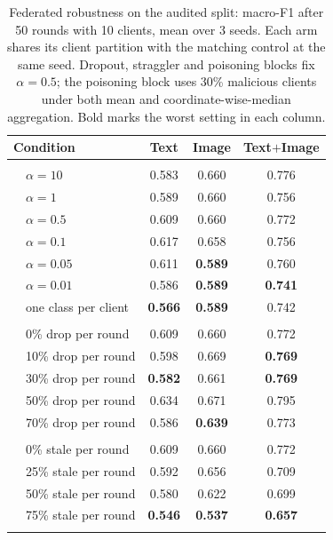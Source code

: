 \begin{table}[t]
\caption{Federated robustness on the audited split: macro-F1 after 50 rounds with 10 clients, mean over 3 seeds. Each arm shares its client partition with the matching control at the same seed. Dropout, straggler and poisoning blocks fix $\alpha=0.5$; the poisoning block uses 30\% malicious clients under both mean and coordinate-wise-median aggregation. Bold marks the worst setting in each column.}
\label{tab:robustness}
\centering\footnotesize
\setlength\tabcolsep{4.5pt}
\begin{tabular}{lccc}
\toprule
Condition & Text & Image & Text$+$Image\\
\midrule
\addlinespace[1pt]
\multicolumn{5}{l}{\emph{Severe label skew}}\\
~~$\alpha=10$ & 0.583 & 0.660 & 0.776\\
~~$\alpha=1$ & 0.589 & 0.660 & 0.756\\
~~$\alpha=0.5$ & 0.609 & 0.660 & 0.772\\
~~$\alpha=0.1$ & 0.617 & 0.658 & 0.756\\
~~$\alpha=0.05$ & 0.611 & \textbf{0.589} & 0.760\\
~~$\alpha=0.01$ & 0.586 & \textbf{0.589} & \textbf{0.741}\\
~~one class per client & \textbf{0.566} & \textbf{0.589} & 0.742\\
\midrule
\addlinespace[1pt]
\multicolumn{5}{l}{\emph{Client dropout}}\\
~~0\% drop per round & 0.609 & 0.660 & 0.772\\
~~10\% drop per round & 0.598 & 0.669 & \textbf{0.769}\\
~~30\% drop per round & \textbf{0.582} & 0.661 & \textbf{0.769}\\
~~50\% drop per round & 0.634 & 0.671 & 0.795\\
~~70\% drop per round & 0.586 & \textbf{0.639} & 0.773\\
\midrule
\addlinespace[1pt]
\multicolumn{5}{l}{\emph{Straggler staleness}}\\
~~0\% stale per round & 0.609 & 0.660 & 0.772\\
~~25\% stale per round & 0.592 & 0.656 & 0.709\\
~~50\% stale per round & 0.580 & 0.622 & 0.699\\
~~75\% stale per round & \textbf{0.546} & \textbf{0.537} & \textbf{0.657}\\
\midrule
\addlinespace[1pt]
\multicolumn{5}{l}{\emph{Poisoned updates}}\\

\end{tabular}
\end{table}
